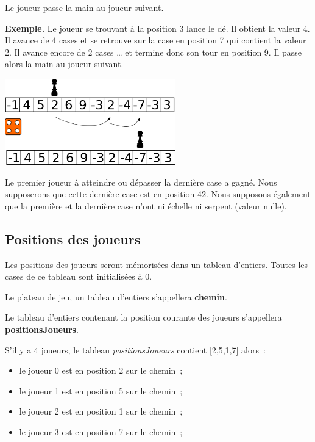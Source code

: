 			Le joueur passe la main au joueur suivant. 
			
			\textbf{Exemple.} Le joueur se trouvant à la position 3 lance le dé. Il
			obtient la valeur 4. Il avance de 4 cases et se retrouve sur la case en
			position 7 qui contient la valeur 2. Il avance encore de 2 cases … et
			termine donc son tour en position 9. Il passe alors la main au joueur suivant.
		
			\begin{center}
				\includegraphics[width=280px]{image/snake-1}
			\end{center}
			
			Le premier joueur à atteindre ou dépasser la dernière case a gagné. Nous supposerons que
			cette dernière case est en position 42. Nous supposons également que la première et la dernière case n’ont ni échelle ni serpent (valeur nulle).
	
		\subsection*{Positions des joueurs}
		
			Les positions des joueurs seront mémorisées dans un tableau d’entiers. 
			Toutes les cases de ce tableau sont initialisées à 0. 
		
			Le plateau de jeu, un tableau d’entiers s’appellera \textbf{chemin}. 
		
			Le tableau d’entiers contenant la position courante des joueurs s’appellera
			\textbf{positionsJoueurs}. 
		
			S’il y a 4 joueurs, le tableau \textit{positionsJoueurs} contient 
			[2,5,1,7] alors~:
			\begin{itemize}
				\item le joueur 0 est en position 2 sur le chemin~;
				\item le joueur 1 est en position 5 sur le chemin~;
				\item le joueur 2 est en position 1 sur le chemin~;
				\item le joueur 3 est en position 7 sur le chemin~;
			\end{itemize}
				
